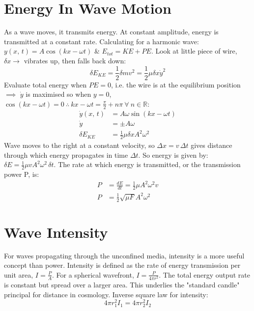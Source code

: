\documentclass[a4paper, 11pt, normalem]{report}
\begin{document}
\section{Energy In Wave Motion}
As a wave moves, it transmits energy.
At constant amplitude, energy is transmitted at a constant rate.
Calculating for a harmonic wave: $y(x,\,t) = A\cos{(kx - \omega t)}$ \& $E_{tot} = KE + PE$.
Look at little piece of wire, $\delta x \rightarrow$ vibrates up, then falls back down:
\begin{equation}
    \delta E_{KE} = \frac{1}{2}\delta mv^{2} = \frac{1}{2}\mu\delta x\dot{y}^{2}
\end{equation}
Evaluate total energy when $PE = 0$, i.e. the wire is at the equilibrium position $\implies$
$\dot{y}$ is maximised so when $y = 0$, $\cos{(kx - \omega t)} = 0 ~\therefore~ kx - \omega t = \frac{\pi}{2} + n\pi ~\forall~ n \in \mathbb{R}$:
\begin{align}
    \dot{y}(x,\,t) &= A\omega\sin{(kx - \omega t)} \\
    \dot{y} &= \pm A\omega \\
    \delta E_{KE} &= \frac{1}{2}\mu\delta xA^{2}\omega^{2}
\end{align}
Wave moves to the right at a constant velocity, so $\Delta x = v \,\Delta t$ gives distance through which energy propagates in time $\Delta t$.
So energy is given by: $\delta E = \frac{1}{2}\mu vA^{2}\omega^{2}\,\delta t$.
The rate at which energy is transmitted, or the transmission power P, is:
\begin{align}
    P &= \frac{dE}{dt} = \frac{1}{2}\mu A^{2}\omega^{2}v \\
    P &= \frac{1}{2}\sqrt{\mu F}A^{2}\omega^{2}
\end{align}

\section{Wave Intensity}
For waves propagating through the unconfined media, intensity is a more useful concept than power.
Intensity is defined as the rate of energy transmission per unit area, $I = \frac{P}{A}$.
For a spherical wavefront, $I = \frac{P}{4\pi r^{2}}$.
The total energy output rate is constant but spread over a larger area.
This underlies the "standard candle" principal for distance in cosmology.
Inverse square law for intensity:
\begin{equation}
    4\pi r^{2}_{1}I_{1} = 4\pi r^{2}_{2}I_{2}
\end{equation}
\end{document}
